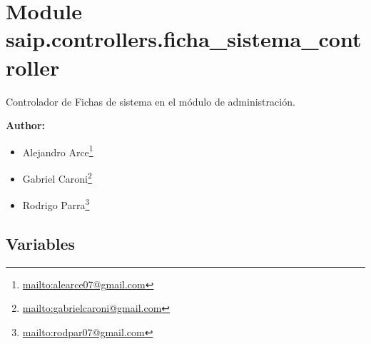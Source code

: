 %
%
%


\section{Module saip.controllers.ficha\_sistema\_controller}

    \label{saip:controllers:ficha_sistema_controller}
Controlador de Fichas de sistema en el módulo de administración.

\textbf{Author:} \begin{itemize}
\setlength{\parskip}{0.6ex}
  \item Alejandro 
    Arce\footnote{\href{mailto:alearce07@gmail.com}{mailto:alearce07@gmail.com}}

  \item Gabriel 
    Caroni\footnote{\href{mailto:gabrielcaroni@gmail.com}{mailto:gabrielcaroni@gmail.com}}

  \item Rodrigo 
    Parra\footnote{\href{mailto:rodpar07@gmail.com}{mailto:rodpar07@gmail.com}}

\end{itemize}





  \subsection{Variables}

